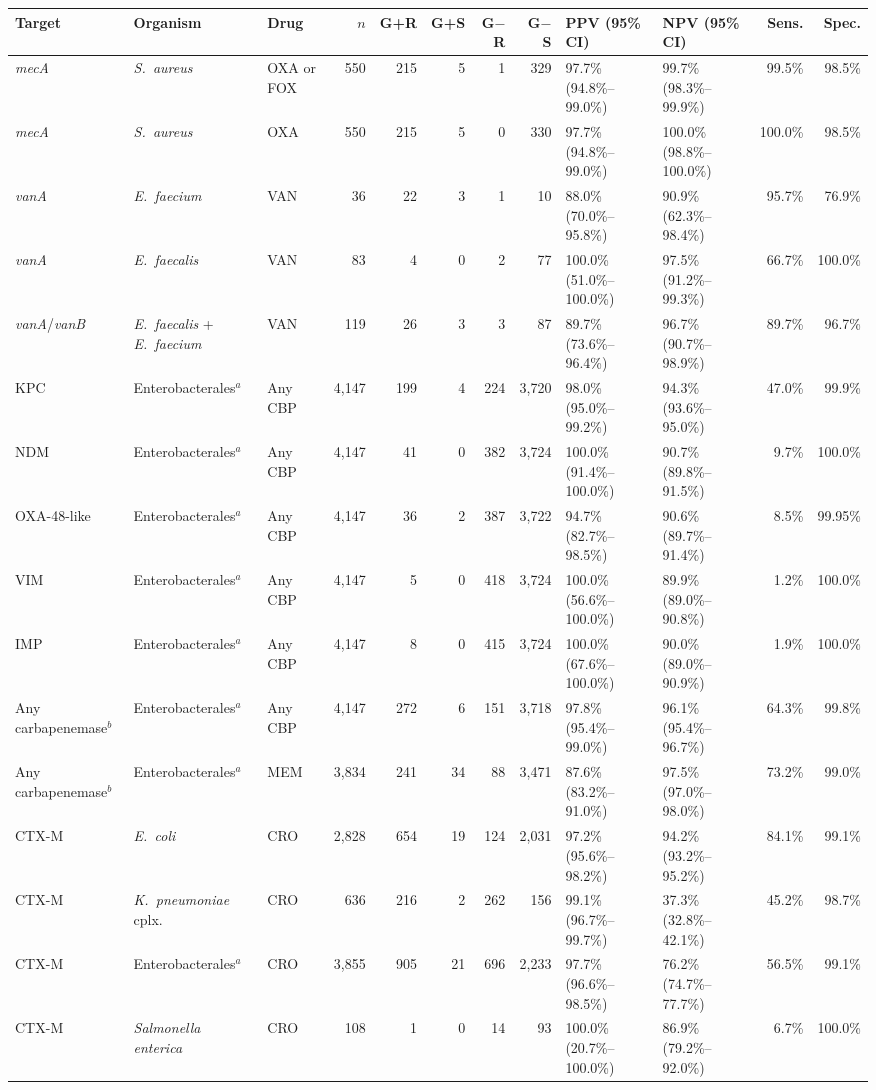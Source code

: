 \begin{tabular}{lllrrrrrllrr}
\hline\hline
Target & Organism & Drug & $n$ & G+R & G+S & G$-$R & G$-$S & PPV (95\% CI) & NPV (95\% CI) & Sens. & Spec. \\
\hline
\textit{mecA} & \textit{S.~aureus} & OXA or FOX & 550 & 215 & 5 & 1 & 329 & 97.7\% (94.8\%--99.0\%) & 99.7\% (98.3\%--99.9\%) & 99.5\% & 98.5\% \\
\textit{mecA} & \textit{S.~aureus} & OXA & 550 & 215 & 5 & 0 & 330 & 97.7\% (94.8\%--99.0\%) & 100.0\% (98.8\%--100.0\%) & 100.0\% & 98.5\% \\
\textit{vanA} & \textit{E.~faecium} & VAN & 36 & 22 & 3 & 1 & 10 & 88.0\% (70.0\%--95.8\%) & 90.9\% (62.3\%--98.4\%) & 95.7\% & 76.9\% \\
\textit{vanA} & \textit{E.~faecalis} & VAN & 83 & 4 & 0 & 2 & 77 & 100.0\% (51.0\%--100.0\%) & 97.5\% (91.2\%--99.3\%) & 66.7\% & 100.0\% \\
\textit{vanA}/\textit{vanB} & \textit{E.~faecalis} + \textit{E.~faecium} & VAN & 119 & 26 & 3 & 3 & 87 & 89.7\% (73.6\%--96.4\%) & 96.7\% (90.7\%--98.9\%) & 89.7\% & 96.7\% \\
KPC & Enterobacterales$^{a}$ & Any CBP & 4{,}147 & 199 & 4 & 224 & 3{,}720 & 98.0\% (95.0\%--99.2\%) & 94.3\% (93.6\%--95.0\%) & 47.0\% & 99.9\% \\
NDM & Enterobacterales$^{a}$ & Any CBP & 4{,}147 & 41 & 0 & 382 & 3{,}724 & 100.0\% (91.4\%--100.0\%) & 90.7\% (89.8\%--91.5\%) & 9.7\% & 100.0\% \\
OXA-48-like & Enterobacterales$^{a}$ & Any CBP & 4{,}147 & 36 & 2 & 387 & 3{,}722 & 94.7\% (82.7\%--98.5\%) & 90.6\% (89.7\%--91.4\%) & 8.5\% & 99.95\% \\
VIM & Enterobacterales$^{a}$ & Any CBP & 4{,}147 & 5 & 0 & 418 & 3{,}724 & 100.0\% (56.6\%--100.0\%) & 89.9\% (89.0\%--90.8\%) & 1.2\% & 100.0\% \\
IMP & Enterobacterales$^{a}$ & Any CBP & 4{,}147 & 8 & 0 & 415 & 3{,}724 & 100.0\% (67.6\%--100.0\%) & 90.0\% (89.0\%--90.9\%) & 1.9\% & 100.0\% \\
Any carbapenemase$^{b}$ & Enterobacterales$^{a}$ & Any CBP & 4{,}147 & 272 & 6 & 151 & 3{,}718 & 97.8\% (95.4\%--99.0\%) & 96.1\% (95.4\%--96.7\%) & 64.3\% & 99.8\% \\
Any carbapenemase$^{b}$ & Enterobacterales$^{a}$ & MEM & 3{,}834 & 241 & 34 & 88 & 3{,}471 & 87.6\% (83.2\%--91.0\%) & 97.5\% (97.0\%--98.0\%) & 73.2\% & 99.0\% \\
CTX-M & \textit{E.~coli} & CRO & 2{,}828 & 654 & 19 & 124 & 2{,}031 & 97.2\% (95.6\%--98.2\%) & 94.2\% (93.2\%--95.2\%) & 84.1\% & 99.1\% \\
CTX-M & \textit{K.~pneumoniae} cplx. & CRO & 636 & 216 & 2 & 262 & 156 & 99.1\% (96.7\%--99.7\%) & 37.3\% (32.8\%--42.1\%) & 45.2\% & 98.7\% \\
CTX-M & Enterobacterales$^{a}$ & CRO & 3{,}855 & 905 & 21 & 696 & 2{,}233 & 97.7\% (96.6\%--98.5\%) & 76.2\% (74.7\%--77.7\%) & 56.5\% & 99.1\% \\
CTX-M & \textit{Salmonella enterica} & CRO & 108 & 1 & 0 & 14 & 93 & 100.0\% (20.7\%--100.0\%) & 86.9\% (79.2\%--92.0\%) & 6.7\% & 100.0\% \\
\hline\hline
\end{tabular}
